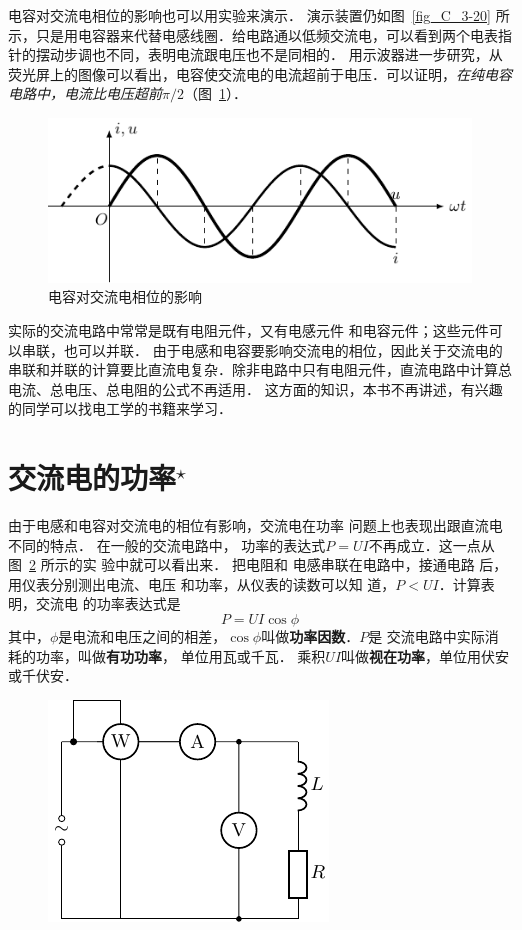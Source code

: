 电容对交流电相位的影响也可以用实验来演示．
演示装置仍如图~\ref{fig_C_3-20} 所示，只是用电容器来代替电感线圈．给电路通以低频交流电，可以看到两个电表指针的摆动步调也不同，表明电流跟电压也不是同相的．
用示波器进一步研究，从荧光屏上的图像可以看出，电容使交流电的电流超前于电压．可以证明，\textit{在纯电容电路中，电流比电压超前$\pi/2$}（图~\ref{fig_C_3-22}）．

\begin{figure}[htbp]
    \centering
    \includegraphics{fig/C/3-22.pdf}
    \caption{电容对交流电相位的影响}\label{fig_C_3-22}
\end{figure}

实际的交流电路中常常是既有电阻元件，又有电感元件
和电容元件；这些元件可以串联，也可以并联．
由于电感和电容要影响交流电的相位，因此关于交流电的串联和并联的计算要比直流电复杂．除非电路中只有电阻元件，直流电路中计算总电流、总电压、总电阻的公式不再适用．
这方面的知识，本书不再讲述，有兴趣的同学可以找电工学的书籍来学习．

\section{交流电的功率$^\star$}


由于电感和电容对交流电的相位有影响，交流电在功率
问题上也表现出跟直流电不同的特点．
在一般的交流电路中，
功率的表达式$P=UI$不再成立．这一点从图~\ref{fig_C_3-23} 所示的实
验中就可以看出来．
把电阻和
电感串联在电路中，接通电路
后，用仪表分别测出电流、电压
和功率，从仪表的读数可以知
道，$P<UI$．计算表明，交流电
的功率表达式是
\[P=UI\cos\phi\]
其中，$\phi$是电流和电压之间的相差，$\cos\phi$叫做\textbf{功率因数}．$P$是
交流电路中实际消耗的功率，叫做\textbf{有功功率}，
单位用瓦或千瓦．
乘积$UI$叫做\textbf{视在功率}，单位用伏安或千伏安．

\begin{figure}[htbp]
	\centering
	\includegraphics{fig/C/3-23.pdf}
	\caption{}\label{fig_C_3-23}
\end{figure}


